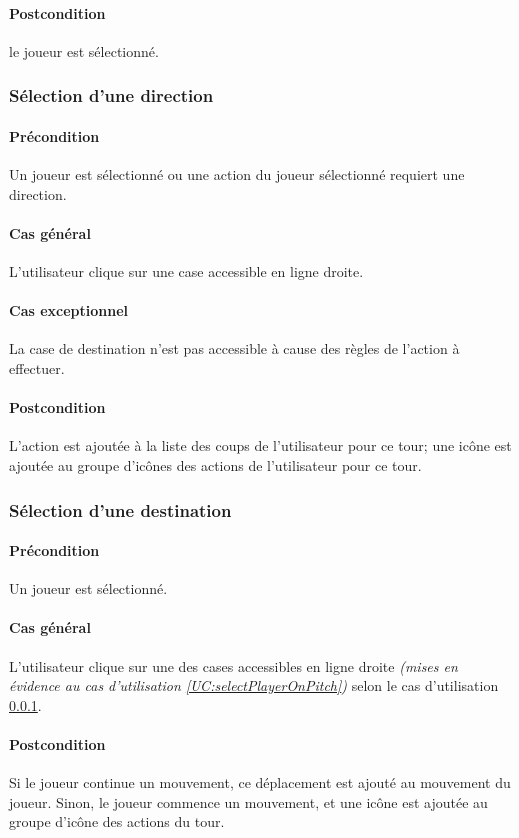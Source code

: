     \paragraph{Postcondition} le joueur est sélectionné. 

\subsubsection{Sélection d'une direction}
    \label{UC:selectDirection}
    \paragraph{Précondition} Un joueur est sélectionné ou une action du joueur sélectionné requiert une direction.
    \paragraph{Cas général} L'utilisateur clique sur une case accessible en ligne droite.
    \paragraph{Cas exceptionnel} La case de destination n'est pas accessible à cause des règles de l'action à effectuer.
    \paragraph{Postcondition} L'action est ajoutée à la liste des coups de l'utilisateur pour ce tour; une icône est ajoutée au groupe d'icônes des actions de l'utilisateur pour ce tour.

\subsubsection{Sélection d'une destination}
    \label{UC:selectDestination}
    \paragraph{Précondition} Un joueur est sélectionné.
    \paragraph{Cas général} L'utilisateur clique sur une des cases accessibles en ligne droite \textit{(mises en évidence au cas d'utilisation \ref{UC:selectPlayerOnPitch})} selon le cas d'utilisation \ref{UC:selectDirection}.
    \paragraph{Postcondition} Si le joueur continue un mouvement, ce déplacement est ajouté au mouvement du joueur. Sinon, le joueur commence un mouvement, et une icône est ajoutée au groupe d'icône des actions du tour.

